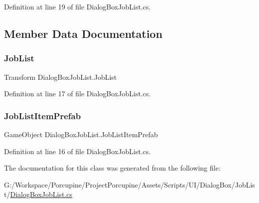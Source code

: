 Definition at line 19 of file Dialog\+Box\+Job\+List.\+cs.



\subsection{Member Data Documentation}
\mbox{\label{class_dialog_box_job_list_a28245735b534be0375f9430fc535e443}} 
\subsubsection{\texorpdfstring{Job\+List}{JobList}}
{\footnotesize\ttfamily Transform Dialog\+Box\+Job\+List.\+Job\+List}



Definition at line 17 of file Dialog\+Box\+Job\+List.\+cs.

\mbox{\label{class_dialog_box_job_list_ab44498019796bbe10874da1e0bf90005}} 
\subsubsection{\texorpdfstring{Job\+List\+Item\+Prefab}{JobListItemPrefab}}
{\footnotesize\ttfamily Game\+Object Dialog\+Box\+Job\+List.\+Job\+List\+Item\+Prefab}



Definition at line 16 of file Dialog\+Box\+Job\+List.\+cs.



The documentation for this class was generated from the following file\+:\begin{DoxyCompactItemize}
\item 
G\+:/\+Workspace/\+Porcupine/\+Project\+Porcupine/\+Assets/\+Scripts/\+U\+I/\+Dialog\+Box/\+Job\+List/\hyperlink{_dialog_box_job_list_8cs}{Dialog\+Box\+Job\+List.\+cs}\end{DoxyCompactItemize}
